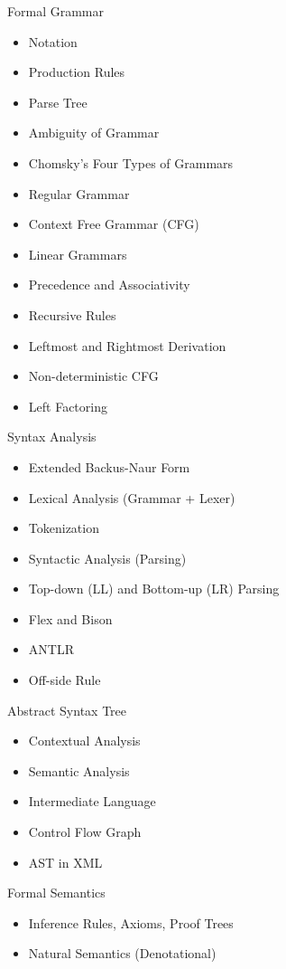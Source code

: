 \documentclass[nobrand,anonymous,nodate,nosecurity]{huawei}
\begin{document}
\begin{lectures}
\item Formal Grammar
	\begin{itemize}
	\item Notation
	\item Production Rules
	\item Parse Tree
	\item Ambiguity of Grammar
	\item Chomsky's Four Types of Grammars
	\item Regular Grammar
	\item Context Free Grammar (CFG)
	\item Linear Grammars
	\item Precedence and Associativity
	\item Recursive Rules
	\item Leftmost and Rightmost Derivation
	\item Non-deterministic CFG
	\item Left Factoring
	\end{itemize}
\item Syntax Analysis
	\begin{itemize}
	\item Extended Backus-Naur Form
	\item Lexical Analysis (Grammar + Lexer)
	\item Tokenization
	\item Syntactic Analysis (Parsing)
	\item Top-down (LL) and Bottom-up (LR) Parsing
	\item Flex and Bison
	\item ANTLR
	\item Off-side Rule
	\end{itemize}
\item Abstract Syntax Tree
	\begin{itemize}
	\item Contextual Analysis
	\item Semantic Analysis
	\item Intermediate Language
	\item Control Flow Graph
	\item AST in XML
	\end{itemize}
\item Formal Semantics
	\begin{itemize}
	\item Inference Rules, Axioms, Proof Trees
	\item Natural Semantics (Denotational)

\end{itemize}
\end{lectures}
\end{document}
